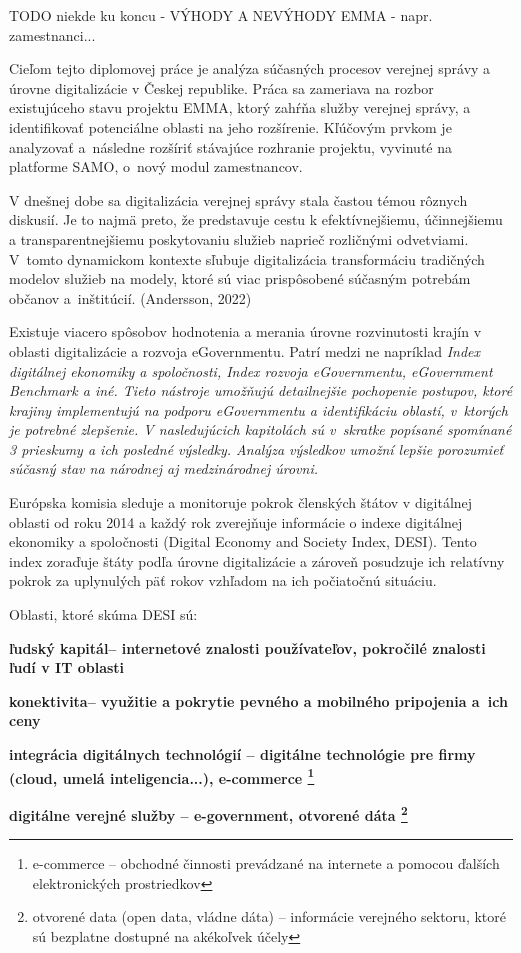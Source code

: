 \TODO
TODO niekde ku koncu - VÝHODY A NEVÝHODY EMMA - napr. zamestnanci...

Cieľom tejto diplomovej práce je analýza súčasných procesov verejnej správy a úrovne digitalizácie v Českej republike. Práca sa zameriava na rozbor existujúceho stavu projektu EMMA, ktorý zahŕňa služby verejnej správy, a identifikovať potenciálne oblasti na jeho rozšírenie. Kľúčovým prvkom je analyzovať a~následne rozšíriť stávajúce rozhranie projektu, vyvinuté na platforme SAMO, o~nový modul zamestnancov. 

V dnešnej dobe sa digitalizácia verejnej správy stala častou témou rôznych diskusií. Je to najmä preto, že predstavuje cestu k efektívnejšiemu, účinnejšiemu a transparentnejšiemu poskytovaniu služieb naprieč rozličnými odvetviami. \zlom V~tomto dynamickom kontexte sľubuje digitalizácia transformáciu tradičných modelov služieb na modely, ktoré sú viac prispôsobené súčasným potrebám občanov a~inštitúcií. \scr(Andersson, 2022)

Existuje viacero spôsobov hodnotenia a merania úrovne rozvinutosti krajín v oblasti digitalizácie a rozvoja eGovernmentu. Patrí medzi ne napríklad \start \it Index digitálnej ekonomiky a spoločnosti, Index rozvoja eGovernmentu, eGovernment Benchmark \stop a iné. Tieto nástroje umožňujú detailnejšie pochopenie postupov, ktoré krajiny implementujú na podporu eGovernmentu a identifikáciu oblastí, v~ktorých je potrebné zlepšenie. V nasledujúcich kapitolách sú v~skratke popísané spomínané 3 prieskumy a ich posledné výsledky. Analýza výsledkov umožní lepšie porozumieť súčasný stav na národnej aj medzinárodnej úrovni.

Európska komisia sleduje a monitoruje pokrok členských štátov v digitálnej oblasti od roku 2014 a každý rok zverejňuje informácie o indexe digitálnej ekonomiky a spoločnosti (Digital Economy and Society Index, DESI). Tento index zoraďuje štáty podľa úrovne digitalizácie a zároveň posudzuje ich relatívny pokrok za uplynulých päť rokov vzhľadom na ich počiatočnú situáciu.

Oblasti, ktoré skúma DESI sú:

\startitemize
\item{\start\bf ľudský kapitál\stop -- internetové znalosti používateľov, pokročilé znalosti ľudí v IT oblasti}
\item{\start\bf konektivita\stop -- využitie a pokrytie pevného a mobilného pripojenia a~ich ceny}
\item{\start\bf integrácia digitálnych technológií \stop -- digitálne technológie pre firmy (cloud, umelá inteligencia...), e-commerce \footnote{e-commerce -- obchodné činnosti prevádzané na internete a pomocou ďalších elektronických prostriedkov}}
\item{\start\bf digitálne verejné služby \stop -- e-government, otvorené dáta \footnote{otvorené data (open data, vládne dáta) -- informácie verejného sektoru, ktoré sú bezplatne dostupné na akékoľvek účely}}
\stopitemize 

